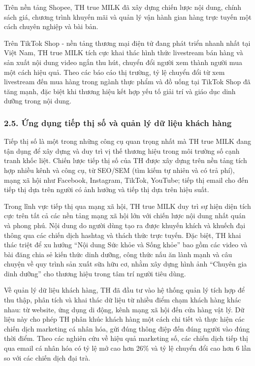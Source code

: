 Trên nền tảng Shopee, TH true MILK đã xây dựng chiến lược nội dung,
chính sách giá, chương trình khuyến mãi và quản lý vận hành gian hàng
trực tuyến một cách chuyên nghiệp và bài bản.

Trên TikTok Shop - nền tảng thương mại điện tử đang phát triển nhanh
nhất tại Việt Nam, TH true MILK tích cực khai thác hình thức livestream
bán hàng và sản xuất nội dung video ngắn thu hút, chuyển đổi người xem
thành người mua một cách hiệu quả. Theo các báo cáo thị trường, tỷ lệ
chuyển đổi từ xem livestream đến mua hàng trong ngành thực phẩm và đồ
uống tại TikTok Shop đã tăng mạnh, đặc biệt khi thương hiệu kết hợp yếu
tố giải trí và giáo dục dinh dưỡng trong nội dung.

\subsubsection{2.5. Ứng dụng tiếp thị số và quản lý dữ liệu khách
hàng}\label{ux1ee9ng-dux1ee5ng-tiux1ebfp-thux1ecb-sux1ed1-vuxe0-quux1ea3n-luxfd-dux1eef-liux1ec7u-khuxe1ch-huxe0ng}

Tiếp thị số là một trong những công cụ quan trọng nhất mà TH true MILK
đang tận dụng để xây dựng và duy trì vị thế thương hiệu trong môi trường
số cạnh tranh khốc liệt. Chiến lược tiếp thị số của TH được xây dựng
trên nền tảng tích hợp nhiều kênh và công cụ, từ SEO/SEM (tìm kiếm tự
nhiên và có trả phí), mạng xã hội như Facebook, Instagram, TikTok,
YouTube; tiếp thị email cho đến tiếp thị dựa trên người có ảnh hưởng và
tiếp thị dựa trên hiệu suất.

Trong lĩnh vực tiếp thị qua mạng xã hội, TH true MILK duy trì sự hiện
diện tích cực trên tất cả các nền tảng mạng xã hội lớn với chiến lược
nội dung nhất quán và phong phú. Nội dung do người dùng tạo ra được
khuyến khích và khuếch đại thông qua các chiến dịch hashtag và thách
thức trực tuyến. Đặc biệt, TH khai thác triệt để xu hướng ``Nội dung Sức
khỏe và Sống khỏe'' bao gồm các video và bài đăng chia sẻ kiến thức dinh
dưỡng, công thức nấu ăn lành mạnh và câu chuyện về quy trình sản xuất
sữa hữu cơ, nhằm xây dựng hình ảnh ``Chuyên gia dinh dưỡng'' cho thương
hiệu trong tâm trí người tiêu dùng.

Về quản lý dữ liệu khách hàng, TH đã đầu tư vào hệ thống quản lý tích
hợp để thu thập, phân tích và khai thác dữ liệu từ nhiều điểm chạm khách
hàng khác nhau: từ website, ứng dụng di động, kênh mạng xã hội đến cửa
hàng vật lý. Dữ liệu này cho phép TH phân khúc khách hàng một cách chi
tiết và thực hiện các chiến dịch marketing cá nhân hóa, gửi đúng thông
điệp đến đúng người vào đúng thời điểm. Theo các nghiên cứu về hiệu quả
marketing số, các chiến dịch tiếp thị qua email cá nhân hóa có tỷ lệ mở
cao hơn 26\% và tỷ lệ chuyển đổi cao hơn 6 lần so với các chiến dịch đại
trà.


